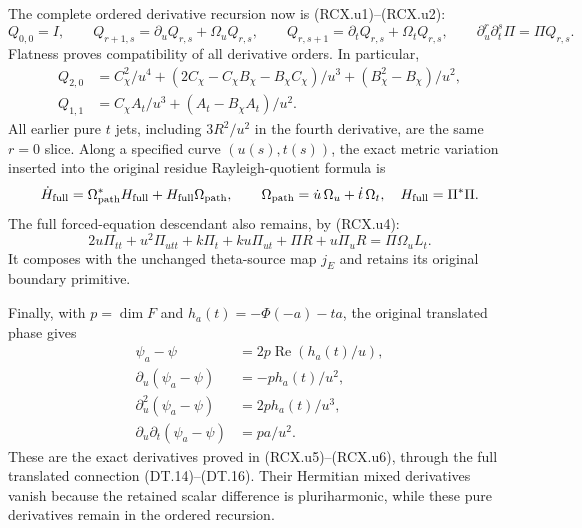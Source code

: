 The complete ordered derivative recursion now is
(RCX.u1)--(RCX.u2):
\[
 Q_{0,0}=I,\qquad
 Q_{r+1,s}=\partial_uQ_{r,s}+\Omega_uQ_{r,s},\qquad
 Q_{r,s+1}=\partial_tQ_{r,s}+\Omega_tQ_{r,s},\qquad
 \partial_u^r\partial_t^s\Pi=\Pi Q_{r,s}.
\]
Flatness proves compatibility of all derivative orders.
In particular,
\[
 \begin{aligned}
 Q_{2,0}
   &=C_\chi^2/u^4+
       (2C_\chi-C_\chi B_\chi-B_\chi C_\chi)/u^3
                       +(B_\chi^2-B_\chi)/u^2,\\
 Q_{1,1}
   &=C_\chi A_t/u^3+(A_t-B_\chi A_t)/u^2.
 \end{aligned}
\]
All earlier pure \(t\) jets, including \(3R^2/u^2\)
in the fourth derivative, are the same \(r=0\) slice.
Along a specified curve \((u(s),t(s))\), the exact
metric variation inserted into the original residue
Rayleigh-quotient formula is
\[
 \dot H_{\rm full}
   =\Omega_{\rm path}^*H_{\rm full}
            +H_{\rm full}\Omega_{\rm path},\qquad
 \Omega_{\rm path}=\dot u\,\Omega_u+\dot t\,\Omega_t,
 \quad H_{\rm full}=\Pi^*\Pi .
\]
The full forced-equation descendant also remains, by (RCX.u4):
\[
 2u\Pi_{tt}+u^2\Pi_{utt}+k\Pi_t+ku\Pi_{ut}
       +\Pi R+u\Pi_uR=\Pi\Omega_u L_t.
\]
It composes with the unchanged theta-source map \(j_E\)
and retains its original boundary primitive.

Finally, with \(p=\dim F\) and
\(h_a(t)=-\Phi(-a)-ta\), the original translated phase gives
\[
 \begin{aligned}
 \psi_a-\psi&=2p\operatorname{Re}(h_a(t)/u),\\
 \partial_u(\psi_a-\psi)&=-p h_a(t)/u^2,\\
 \partial_u^2(\psi_a-\psi)&=2p h_a(t)/u^3,\\
 \partial_u\partial_t(\psi_a-\psi)&=pa/u^2 .
 \end{aligned}
\]
These are the exact derivatives proved in
(RCX.u5)--(RCX.u6), through the full translated
connection (DT.14)--(DT.16).  Their Hermitian mixed
derivatives vanish because the retained scalar
difference is pluriharmonic, while these pure
derivatives remain in the ordered recursion.

